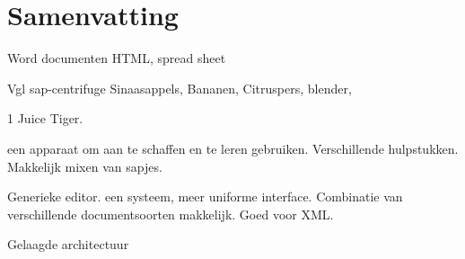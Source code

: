 \chapter*{Samenvatting}


Word documenten HTML, spread sheet

Vgl sap-centrifuge Sinaasappels, Bananen, 
Citruspers, blender, 

1 Juice Tiger. 

een apparaat om aan te schaffen en te leren gebruiken. Verschillende hulpstukken. Makkelijk mixen van sapjes.

Generieke editor. een systeem, meer uniforme interface. Combinatie van verschillende documentsoorten makkelijk. Goed voor XML.

Gelaagde architectuur